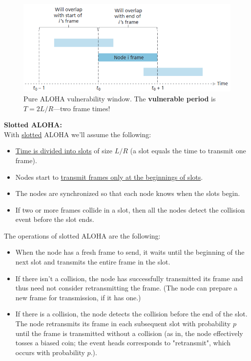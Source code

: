 \begin{figure}[H]
    \centering
    \includegraphics[width = 0.75\linewidth]{img/5/vulnerability.png}
    \caption{Pure ALOHA vulnerability window. The \textbf{vulnerable period} is $T = 2L/R$---two frame times!}
    \label{fig:ALOHA-puro-vulnerability}
\end{figure}

\clearpage
\noindent \textbf{Slotted ALOHA:}\\[2pt]
\noindent With \underline{slotted} ALOHA we'll assume the following:
\begin{itemize}[nolistsep,noitemsep] \small
    \item \underline{Time is divided into slots} of size $L/R$ (a slot equals the time to transmit one frame).
    \item Nodes start to \underline{transmit frames only at the beginnings of slots}.
    \item The nodes are synchronized so that each node knows when the slots begin.
    \item If two or more frames collide in a slot, then all the nodes detect the collision event before the slot ends.
\end{itemize}

\vspace{0.5em}
\noindent The operations of slotted ALOHA are the following:
\begin{itemize}
    \item When the node has a fresh frame to send, it waits until the beginning of the next slot and transmits the entire frame in the slot.
    
    \item If there isn’t a collision, the node has successfully transmitted its frame and thus need not consider retransmitting the frame. (The node can prepare a new frame for transmission, if it has one.)
    
    \item If there is a collision, the node detects the collision before the end of the slot. The node retransmits its frame in each subsequent slot with probability $p$ until the frame is transmitted without a collision (as in, the node effectively tosses a biased coin; the event heads corresponds to "retransmit", which occurs with probability $p$.).
\end{itemize}

